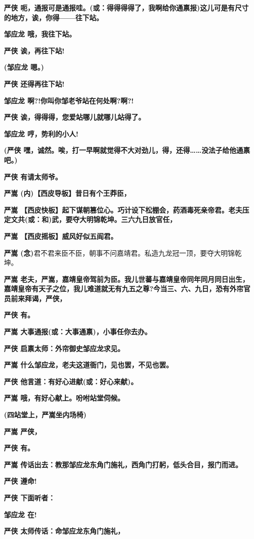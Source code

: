 \textbf{严侠
呃，通报可是通报哇。(或：得得得得了，我啊给你通禀报)这儿可是有尺寸的地方，诶，你得------往下站。}

\textbf{邹应龙 哦，我往下站。}

\textbf{严侠 诶，再往下站!}

\textbf{(邹应龙 嗯。)}

\textbf{严侠 还得再往下站!}

\textbf{邹应龙 啊?!你叫你邹老爷站在何处啊?啊?!}

\textbf{严侠 诶，得得得，您爱站哪儿就哪儿站得了。}

\textbf{邹应龙 哼，势利的小人!}

\textbf{(严侠
嘿，诚然。唉，打一早啊就觉得不大对劲儿，得，还得\ldots{}\ldots{}没法子给他通禀吧。)}

\textbf{严侠 有请太师爷。}

\textbf{严嵩 (内)【西皮导板】昔日有个王莽臣，}

\textbf{严嵩
【西皮快板】起下谋朝篡位心。巧计设下松棚会，药酒毒死亲帝君。老夫压定文共(或：和)武，要夺大明锦乾坤。三六九日放官任，}

\textbf{严嵩 【西皮摇板】威风好似五阎君。}

\textbf{严嵩
(念)}君不君来臣不臣，朝事不问嘉靖君。私造九龙冠一顶，要夺大明锦乾坤。

\textbf{严嵩
老夫，严嵩，嘉靖皇帝驾前为臣。我儿世蕃与嘉靖皇帝同年同月同日出生，嘉靖皇帝有天子之位，我儿难道就无有九五之尊?今当三、六、九日，恐有外帘官员前来拜谒，严侠，}

\textbf{严侠 有。}

\textbf{严嵩 大事通报(或：大事通禀)，小事任你去办。}

\textbf{严侠 启禀太师：外帘御史邹应龙求见。}

\textbf{严嵩 什么邹应龙，老夫这道衙门，见也罢，不见也罢。}

\textbf{严侠 他言道：有好心进献(或：好心来献)。}

\textbf{严嵩 哦，有好心献上。吩咐站堂伺候。}

\textbf{(四站堂上，严嵩坐内场椅)}

\textbf{严嵩 严侠，}

\textbf{严侠 有。}

\textbf{严嵩
传话出去：教那邹应龙东角门施礼，西角门打躬，低头合目，报门而进。}

\textbf{严侠 遵命!}

\textbf{严侠 下面听者：}

\textbf{邹应龙 在!}

\textbf{严侠 太师传话：命邹应龙东角门施礼，}


